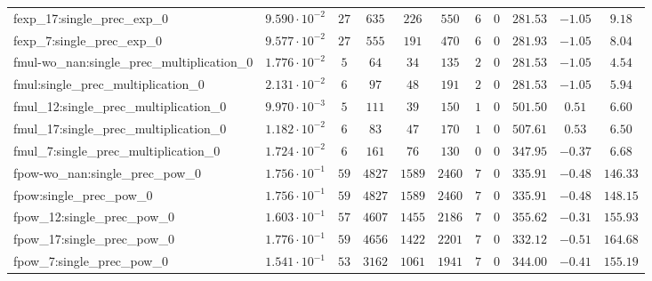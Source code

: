\begin{tabular}{|l|c|c|c|c|c|c|c|c|c|c|}
fexp\_17:single\_prec\_exp\_0                  & $ 9.590 \cdot 10^{-2} $ & $ 27     $ & $ 635    $ & $ 226   $ & $ 550    $ & $ 6   $ & $ 0 $ & $ 281.53      $ & $ -1.05   $ & $ 9.18    $ \\
fexp\_7:single\_prec\_exp\_0                   & $ 9.577 \cdot 10^{-2} $ & $ 27     $ & $ 555    $ & $ 191   $ & $ 470    $ & $ 6   $ & $ 0 $ & $ 281.93      $ & $ -1.05   $ & $ 8.04    $ \\
fmul-wo\_nan:single\_prec\_multiplication\_0   & $ 1.776 \cdot 10^{-2} $ & $ 5      $ & $ 64     $ & $ 34    $ & $ 135    $ & $ 2   $ & $ 0 $ & $ 281.53      $ & $ -1.05   $ & $ 4.54    $ \\
fmul:single\_prec\_multiplication\_0           & $ 2.131 \cdot 10^{-2} $ & $ 6      $ & $ 97     $ & $ 48    $ & $ 191    $ & $ 2   $ & $ 0 $ & $ 281.53      $ & $ -1.05   $ & $ 5.94    $ \\
fmul\_12:single\_prec\_multiplication\_0       & $ 9.970 \cdot 10^{-3} $ & $ 5      $ & $ 111    $ & $ 39    $ & $ 150    $ & $ 1   $ & $ 0 $ & $ 501.50      $ & $ 0.51    $ & $ 6.60    $ \\
fmul\_17:single\_prec\_multiplication\_0       & $ 1.182 \cdot 10^{-2} $ & $ 6      $ & $ 83     $ & $ 47    $ & $ 170    $ & $ 1   $ & $ 0 $ & $ 507.61      $ & $ 0.53    $ & $ 6.50    $ \\
fmul\_7:single\_prec\_multiplication\_0        & $ 1.724 \cdot 10^{-2} $ & $ 6      $ & $ 161    $ & $ 76    $ & $ 130    $ & $ 0   $ & $ 0 $ & $ 347.95      $ & $ -0.37   $ & $ 6.68    $ \\
fpow-wo\_nan:single\_prec\_pow\_0              & $ 1.756 \cdot 10^{-1} $ & $ 59     $ & $ 4827   $ & $ 1589  $ & $ 2460   $ & $ 7   $ & $ 0 $ & $ 335.91      $ & $ -0.48   $ & $ 146.33  $ \\
fpow:single\_prec\_pow\_0                      & $ 1.756 \cdot 10^{-1} $ & $ 59     $ & $ 4827   $ & $ 1589  $ & $ 2460   $ & $ 7   $ & $ 0 $ & $ 335.91      $ & $ -0.48   $ & $ 148.15  $ \\
fpow\_12:single\_prec\_pow\_0                  & $ 1.603 \cdot 10^{-1} $ & $ 57     $ & $ 4607   $ & $ 1455  $ & $ 2186   $ & $ 7   $ & $ 0 $ & $ 355.62      $ & $ -0.31   $ & $ 155.93  $ \\
fpow\_17:single\_prec\_pow\_0                  & $ 1.776 \cdot 10^{-1} $ & $ 59     $ & $ 4656   $ & $ 1422  $ & $ 2201   $ & $ 7   $ & $ 0 $ & $ 332.12      $ & $ -0.51   $ & $ 164.68  $ \\
fpow\_7:single\_prec\_pow\_0                   & $ 1.541 \cdot 10^{-1} $ & $ 53     $ & $ 3162   $ & $ 1061  $ & $ 1941   $ & $ 7   $ & $ 0 $ & $ 344.00      $ & $ -0.41   $ & $ 155.19  $ \\

\end{tabular}
